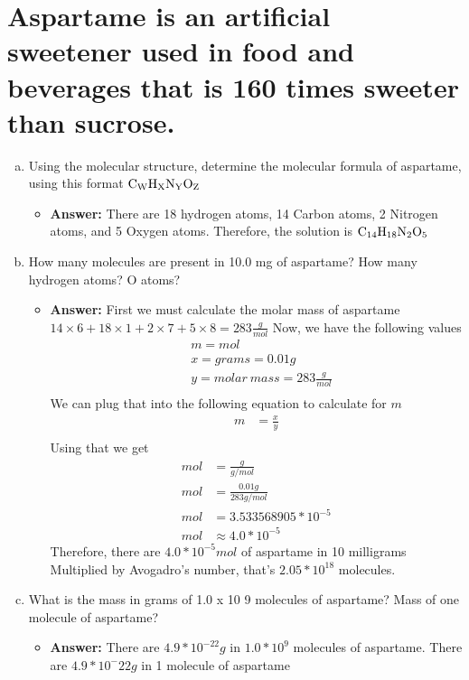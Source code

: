 \documentclass[11pt]{article}
\begin{document}
\section{Aspartame is an artificial sweetener used in food and beverages that is 160 times sweeter than sucrose.}
\label{sec:org3c5f773}
\begin{enumerate}[(a)]
\item Using the molecular structure, determine the molecular formula of aspartame,
using this format \(\ce{C_{W}H_{X}N_{Y}O_{Z}}\)
\begin{itemize}
\item \textbf{Answer:} There are 18 hydrogen atoms, 14 Carbon atoms, 2 Nitrogen atoms, and 5 Oxygen atoms. Therefore, the solution is \(\ce{C14H18N2O5}\)
\end{itemize}

\item How many molecules are present in 10.0 mg of aspartame? How many hydrogen
atoms? O atoms?

\begin{itemize}
\item \textbf{Answer:} First we must calculate the molar mass of aspartame
\(14\times6+18\times1+2\times7+5\times8=283\frac{g}{mol}\)
Now, we have the following values
    \begin{align*}
    &m=mol\\
    &x=grams=0.01g\\
    &y=molar\ mass=283\frac{g}{mol}\\
\end{align*}
We can plug that into the following equation to calculate for   \(m\)
    \begin{align*}
    m&=\frac{x}{y}\\
\end{align*}
Using that we get
\begin{align*}
mol&=\frac{g}{g/mol}\\
mol&=\frac{0.01g}{283g/mol}\\
mol&=3.533568905*10^{-5}\\
mol&\approx4.0*10^{-5}
\end{align*}
Therefore, there are \(4.0*10^{-5}mol\) of aspartame in 10 milligrams
Multiplied by Avogadro's number, that's \(2.05*10^{18}\) molecules.
\end{itemize}

\item What is the mass in grams of 1.0 x 10 9 molecules of aspartame? Mass of one molecule of aspartame?
\begin{itemize}
\item \textbf{Answer:} There are \(4.9*10^{-22}g\) in \(1.0*10^{9}\) molecules of aspartame. There are \(4.9*10^-22g\) in 1 molecule of aspartame
\end{itemize}
\end{enumerate}
\end{document}
